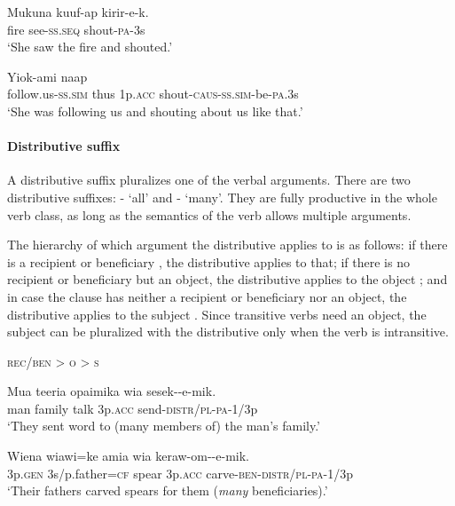 \ea%
\label{ex:3:x991}
\gll Mukuna kuuf-ap kirir-e-k. \\
fire see-\textsc{ss}.\textsc{seq} shout-\textsc{pa}-3s\\
\glt`She saw the fire and shouted.'
\z

\ea%
\label{ex:3:x489}
\gll Yiok-ami naap   \\
follow.us-\textsc{ss}.\textsc{sim} thus 1p.\textsc{acc} shout-\textsc{caus}-\textsc{ss}.\textsc{sim}-be-\textsc{pa}.3s\\
\glt`She was following us and shouting about us like that.'
\z

\paragraph{Distributive suffix}\label{sec:3.8.2.3.2}
{}
A distributive suffix pluralizes one of the verbal arguments. There are two distributive suffixes: \nobreakdash- `all' and \nobreakdash- `many'. They are fully productive in the whole verb class, as long as the semantics of the verb allows multiple arguments. 

The hierarchy of which argument the distributive applies to is as follows: if there is a recipient  or beneficiary , the distributive applies to that; if there is no recipient or beneficiary but an object, the distributive applies to the object ; and in case the clause has neither a recipient or beneficiary nor an object, the distributive applies to the subject . Since transitive verbs need an object, the subject can be pluralized with the distributive only when the verb is intransitive.

\ea
\upshape
\textsc{rec/ben {{\textgreater}} o {{\textgreater}} s}
\z

\ea%
\label{ex:3:x209}
\gll Mua teeria opaimika wia sesek--e-mik. \\
man family talk 3p.\textsc{acc} send-\textsc{distr}/\textsc{pl}-\textsc{pa}-1/3p \\
\glt`They sent word to (many members of) the man's family.'
\z

\ea%
\label{ex:3:x429}
\gll Wiena wiawi=ke amia wia keraw-om--e-mik. \\
3p.\textsc{gen} 3s/p.father=\textsc{cf} spear 3p.\textsc{acc} carve-\textsc{ben}-\textsc{distr}/\textsc{pl}-\textsc{pa}-1/3p\\
\glt`Their fathers carved spears for them (\textit{many} beneficiaries).'
\z

